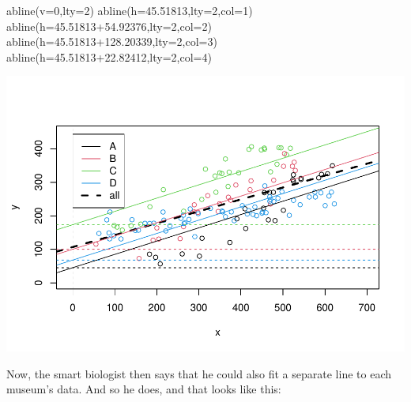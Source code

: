 \documentclass[
]{book}
\newenvironment{Shaded}{\begin{snugshade}}{\end{snugshade}}
\newcommand{\AttributeTok}[1]{\textcolor[rgb]{0.77,0.63,0.00}{#1}}
\newcommand{\DecValTok}[1]{\textcolor[rgb]{0.00,0.00,0.81}{#1}}
\newcommand{\FloatTok}[1]{\textcolor[rgb]{0.00,0.00,0.81}{#1}}
\newcommand{\FunctionTok}[1]{\textcolor[rgb]{0.00,0.00,0.00}{#1}}
\newcommand{\NormalTok}[1]{#1}
\begin{document}
\begin{Shaded}
\begin{Highlighting}[]
\FunctionTok{abline}\NormalTok{(}\AttributeTok{v=}\DecValTok{0}\NormalTok{,}\AttributeTok{lty=}\DecValTok{2}\NormalTok{)}
\FunctionTok{abline}\NormalTok{(}\AttributeTok{h=}\FloatTok{45.51813}\NormalTok{,}\AttributeTok{lty=}\DecValTok{2}\NormalTok{,}\AttributeTok{col=}\DecValTok{1}\NormalTok{)}
\FunctionTok{abline}\NormalTok{(}\AttributeTok{h=}\FloatTok{45.51813+54.92376}\NormalTok{,}\AttributeTok{lty=}\DecValTok{2}\NormalTok{,}\AttributeTok{col=}\DecValTok{2}\NormalTok{)}
\FunctionTok{abline}\NormalTok{(}\AttributeTok{h=}\FloatTok{45.51813+128.20339}\NormalTok{,}\AttributeTok{lty=}\DecValTok{2}\NormalTok{,}\AttributeTok{col=}\DecValTok{3}\NormalTok{)}
\FunctionTok{abline}\NormalTok{(}\AttributeTok{h=}\FloatTok{45.51813+22.82412}\NormalTok{,}\AttributeTok{lty=}\DecValTok{2}\NormalTok{,}\AttributeTok{col=}\DecValTok{4}\NormalTok{)}
\end{Highlighting}
\end{Shaded}

\includegraphics{ECOMODbook_files/figure-latex/a7.14-1.pdf}

Now, the smart biologist then says that he could also fit a separate line to each museum's data. And so he does, and that looks like this:
\end{document}
